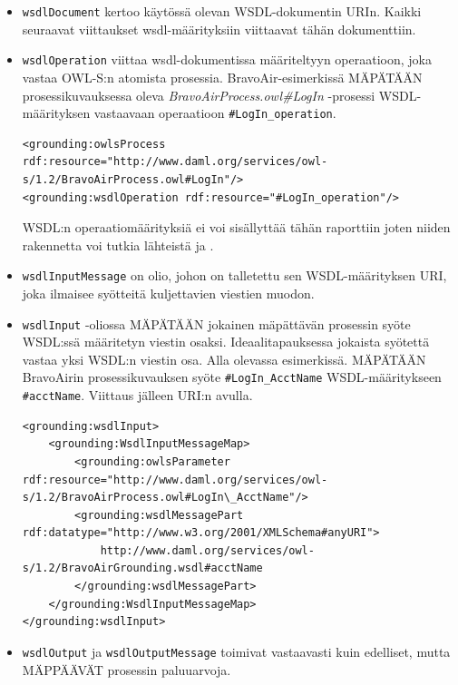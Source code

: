 \documentclass[finnish]{tktltiki2}
\theoremstyle{definition}
\theoremstyle{remark}
\begin{document}
\begin{itemize}
\item \texttt{wsdlDocument} kertoo käytössä olevan WSDL-dokumentin URIn. Kaikki seuraavat viittaukset wsdl-määrityksiin viittaavat tähän dokumenttiin. 

\item \texttt{wsdlOperation} viittaa wsdl-dokumentissa määriteltyyn operaatioon, joka vastaa OWL-S:n  atomista prosessia. BravoAir-esimerkissä MÄPÄTÄÄN 
prosessikuvauksessa oleva \textit{BravoAirProcess.owl\#LogIn} -prosessi WSDL-määrityksen vastaavaan operaatioon \texttt{\#LogIn\_operation}. 

\begin{verbatim}
<grounding:owlsProcess rdf:resource="http://www.daml.org/services/owl-s/1.2/BravoAirProcess.owl#LogIn"/>
<grounding:wsdlOperation rdf:resource="#LogIn_operation"/>
\end{verbatim}

WSDL:n operaatiomäärityksiä ei voi sisällyttää tähän raporttiin joten niiden rakennetta voi tutkia lähteistä \cite{daml} ja \cite{WSDL}. 

\item \texttt{wsdlInputMessage} on olio, johon on talletettu sen  WSDL-määrityksen URI, joka ilmaisee syötteitä kuljettavien viestien muodon.  

\item \texttt{wsdlInput} -oliossa MÄPÄTÄÄN jokainen mäpättävän prosessin syöte WSDL:ssä  määritetyn viestin osaksi. Ideaalitapauksessa jokaista syötettä vastaa yksi WSDL:n viestin osa. Alla olevassa esimerkissä. MÄPÄTÄÄN BravoAirin prosessikuvauksen syöte \texttt{\#LogIn\_AcctName} WSDL-määritykseen  \texttt{\#acctName}. Viittaus jälleen URI:n avulla. 
\begin{verbatim}
<grounding:wsdlInput>
    <grounding:WsdlInputMessageMap>
        <grounding:owlsParameter rdf:resource="http://www.daml.org/services/owl-s/1.2/BravoAirProcess.owl#LogIn\_AcctName"/>
        <grounding:wsdlMessagePart rdf:datatype="http://www.w3.org/2001/XMLSchema#anyURI">
            http://www.daml.org/services/owl-s/1.2/BravoAirGrounding.wsdl#acctName
        </grounding:wsdlMessagePart>
    </grounding:WsdlInputMessageMap>
</grounding:wsdlInput>
\end{verbatim}

\item \texttt{wsdlOutput} ja \texttt{wsdlOutputMessage} toimivat vastaavasti kuin edelliset, mutta MÄPPÄÄVÄT prosessin paluuarvoja.
\end{itemize}


%
%
% 
%



\end{document}
